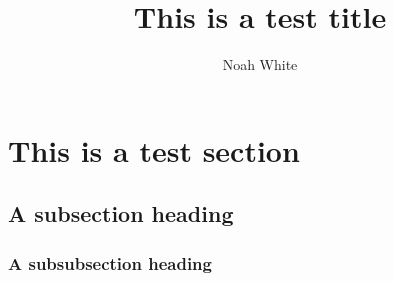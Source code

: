 \documentclass[a4paper]{research_note}
\title{This is a test title}
\author{Noah White}
\begin{document}
\maketitle


\section{This is a test section}
\lipsum[2]

\subsection{A subsection heading}
\lipsum[1]

\subsubsection{A subsubsection heading}
\lipsum[1]
\end{document}
